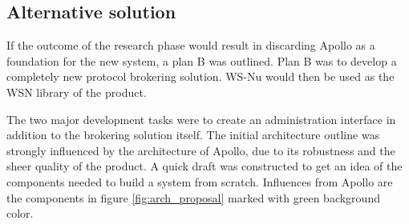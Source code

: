 \begin{table}[ht!]
\centering
{}
\caption{Risk analysis for building the system based on Apollo}
\label{tab:risk_analysis_apollo}
\end{table}

\subsection{Alternative solution}
\label{subsec:prestudies-alternate_solution}

If the outcome of the research phase would result in discarding Apollo as a foundation for the new system, a plan B was outlined. Plan B was to develop a completely new protocol brokering solution. WS-Nu would then be used as the WSN library of the product. 

The two major development tasks were to create an administration interface in addition to the brokering solution itself. The initial architecture outline was strongly influenced by the architecture of Apollo, due to its robustness and the sheer quality of the product. A quick draft was constructed to get an idea of the components needed to build a system from scratch. Influences from Apollo are the components in figure \ref{fig:arch_proposal} marked with green background color.


